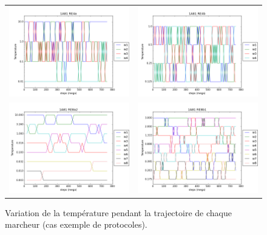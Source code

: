    \begin{figure}[t]
     \centering
     \begin{tabular}{cc}
       \includegraphics[width=8.45cm]{graphe/1A81-RE4a-T_traj.png} &
       \includegraphics[width=8.45cm]{graphe/1A81-RE4b-T_traj.png} \\
       \includegraphics[width=8.45cm]{graphe/1A81-RE8a2-T_traj.png} &
       \includegraphics[width=8.45cm]{graphe/1A81-RE8b1-T_traj.png} \\
     \end{tabular}
     \caption{Variation de la température pendant la trajectoire de chaque marcheur (cas exemple de protocoles).}
\label{graph:TRAJ_T}
   \end{figure}


